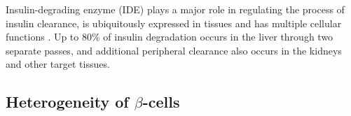 



Insulin-degrading enzyme (IDE) plays a major role in regulating the process of insulin clearance, is ubiquitously expressed in tissues and has multiple cellular functions \textbf{\cite{duckworth_insulin_1998}}. Up to 80\% of insulin degradation occurs in the liver through two separate passes, and additional peripheral clearance also occurs in the kidneys and other target tissues.




\subsection{Heterogeneity of $\beta$-cells} %
\label{sec:beta_het}


